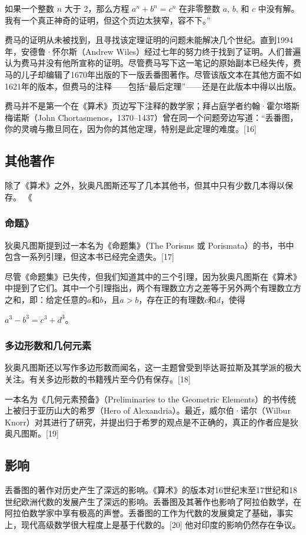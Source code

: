 如果一个整数 \( n \) 大于 2，那么方程 \( a^n + b^n = c^n \) 在非零整数 \( a \), \( b \), 和 \( c \) 中没有解。我有一个真正神奇的证明，但这个页边太狭窄，容不下。”

费马的证明从未被找到，且寻找该定理证明的问题未能解决几个世纪。直到1994年，安德鲁·怀尔斯（Andrew Wiles）经过七年的努力终于找到了证明。人们普遍认为费马并没有他所宣称的证明。尽管费马写下这一笔记的原始副本已经失传，费马的儿子却编辑了1670年出版的下一版丢番图著作。尽管该版文本在其他方面不如1621年的版本，但费马的注释——包括“最后定理”——还是在此版本中得以出版。

费马并不是第一个在《算术》页边写下注释的数学家；拜占庭学者约翰·霍尔塔斯梅诺斯（John Chortasmenos，1370–1437）曾在同一个问题旁边写道：“丢番图，你的灵魂与撒旦同在，因为你的其他定理，特别是此定理的难度。[16]
\subsection{其他著作}  
除了《算术》之外，狄奥凡图斯还写了几本其他书，但其中只有少数几本得以保存。
《\subsubsection{命题》}  
狄奥凡图斯提到过一本名为《命题集》（The Porisms 或 Porismata）的书，书中包含一系列引理，但这本书已经完全遗失。[17]

尽管《命题集》已失传，但我们知道其中的三个引理，因为狄奥凡图斯在《算术》中提到了它们。其中一个引理指出，两个有理数立方之差等于另外两个有理数立方之和，即：给定任意的\(a\)和\(b\)，且\(a > b\)，存在正的有理数\(c\)和\(d\)，使得

\(a^3-b^3=c^3+d^3\)。

\subsubsection{多边形数和几何元素}  
狄奥凡图斯还以写作多边形数而闻名，这一主题曾受到毕达哥拉斯及其学派的极大关注。有关多边形数的书籍残片至今仍有保存。[18]

一本名为《几何元素预备》（Preliminaries to the Geometric Elements）的书传统上被归于亚历山大的希罗（Hero of Alexandria）。最近，威尔伯·诺尔（Wilbur Knorr）对其进行了研究，并提出归于希罗的观点是不正确的，真正的作者应是狄奥凡图斯。[19]
\subsection{影响}  
丢番图的著作对历史产生了深远的影响。《算术》的版本对16世纪末至17世纪和18世纪欧洲代数的发展产生了深远的影响。丢番图及其著作也影响了阿拉伯数学，在阿拉伯数学家中享有极高的声誉。丢番图的工作为代数的发展奠定了基础，事实上，现代高级数学很大程度上是基于代数的。[20] 他对印度的影响仍然存在争议。

